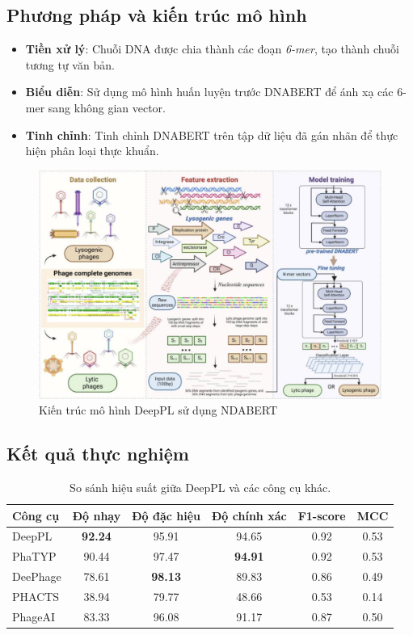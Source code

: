 \subsection*{Phương pháp và kiến trúc mô hình}

\begin{itemize}
    \item \textbf{Tiền xử lý}: Chuỗi DNA được chia thành các đoạn \textit{6-mer}, tạo thành chuỗi tương tự văn bản.
    \item \textbf{Biểu diễn}: Sử dụng mô hình huấn luyện trước DNABERT để ánh xạ các 6-mer sang không gian vector.
    \item \textbf{Tinh chỉnh}: Tinh chỉnh DNABERT trên tập dữ liệu đã gán nhãn để thực hiện phân loại thực khuẩn.
\end{itemize}
\begin{figure}[H]
    \centering
    \includegraphics[width=1\linewidth]{figures/DeepPL_model.png}
    \caption{Kiến trúc mô hình DeepPL sử dụng NDABERT}
    \label{fig:DeepPL_model}
\end{figure}

\subsection*{Kết quả thực nghiệm}

\begin{table}[ht]
\centering
\caption{So sánh hiệu suất giữa DeepPL và các công cụ khác.}
\label{tab:performance_comparison_deeppl}
\begin{tabular}{|l|c|c|c|c|c|}
\hline
\textbf{Công cụ} & \textbf{Độ nhạy} & \textbf{Độ đặc hiệu} & \textbf{Độ chính xác} & \textbf{F1-score} & \textbf{MCC} \\
\hline
DeepPL   & \textbf{92.24}  & 95.91 & 94.65 & 0.92 & 0.53 \\
PhaTYP   & 90.44 & 97.47 & \textbf{94.91} & 0.92 & 0.53 \\
DeePhage & 78.61 & \textbf{98.13} & 89.83 & 0.86 & 0.49 \\
PHACTS   & 38.94 & 79.77 & 48.66 & 0.53 & 0.14 \\
PhageAI  & 83.33 & 96.08 & 91.17 & 0.87 & 0.50 \\
\hline
\end{tabular}
\end{table}

